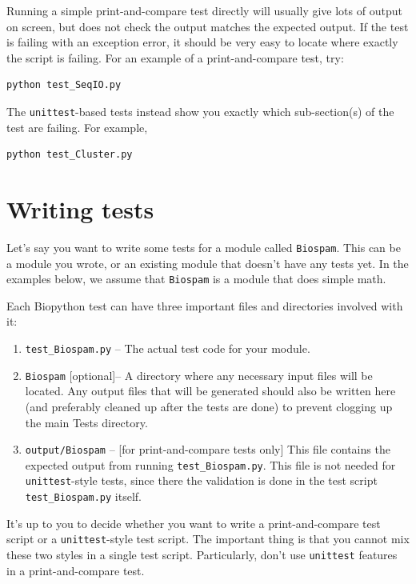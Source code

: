 \documentclass{report}
\begin{document}
Running a simple print-and-compare test directly will usually give lots
of output on screen, but does not check the output matches the expected
output.  If the test is failing with an exception error, it should be
very easy to locate where exactly the script is failing.
For an example of a print-and-compare test, try:
\begin{verbatim}
python test_SeqIO.py
\end{verbatim}

The \verb|unittest|-based tests instead show you exactly which sub-section(s) of
the test are failing. For example,
\begin{verbatim}
python test_Cluster.py
\end{verbatim}

\section{Writing tests}

Let's say you want to write some tests for a module called \verb|Biospam|.
This can be a module you wrote, or an existing module that doesn't have
any tests yet.  In the examples below, we assume that
\verb|Biospam| is a module that does simple math.

Each Biopython test can have three important files and directories involved with it:

\begin{enumerate}
  \item \verb|test_Biospam.py| -- The actual test code for your module.
  \item \verb|Biospam| [optional]-- A directory where any necessary input files
    will be located. Any output files that will be generated should also
    be written here (and preferably cleaned up after the tests are
    done) to prevent clogging up the main Tests directory.
  \item \verb|output/Biospam| -- [for print-and-compare tests only] This
    file contains the expected output from running \verb|test_Biospam.py|.
    This file is not needed for \verb|unittest|-style tests, since there
    the validation is done in the test script \verb|test_Biospam.py| itself.
\end{enumerate}

It's up to you to decide whether you want to write a print-and-compare test script or a \verb|unittest|-style test script. The important thing is that you cannot mix these two styles in a single test script. Particularly, don't use \verb|unittest| features in a print-and-compare test.
\end{document}
